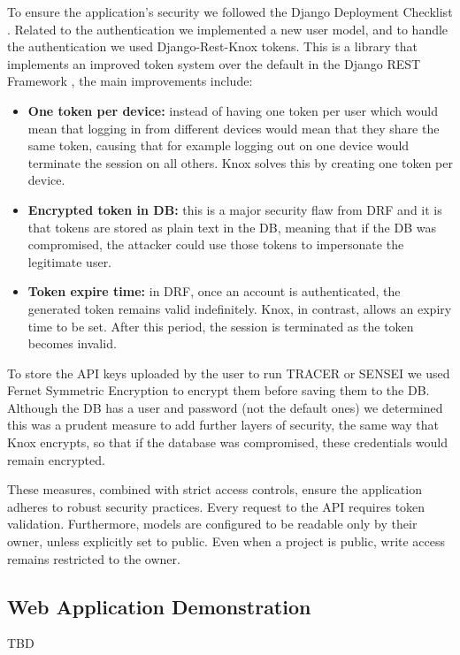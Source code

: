 To ensure the application's security we followed the Django Deployment Checklist \autocite{DeploymentChecklistDjango}.
Related to the authentication we implemented a new user model,
and to handle the authentication we used Django-Rest-Knox \autocite{DjangoRestKnox} tokens.
This is a library that implements an improved token system over the default in the Django REST Framework \autocite{DjangoRESTFramework},
the main improvements include:
\begin{itemize}
  \item \textbf{One token per device:}
    instead of having one token per user
    which would mean that logging in from different devices
    would mean that they share the same token,
    causing that for example
    logging out on one device would terminate the session on all others.
    Knox solves this by creating one token per device.

  \item \textbf{Encrypted token in \ac{DB}:}
    this is a major security flaw from \ac{DRF}
    and it is that tokens are stored as plain text in the \ac{DB},
    meaning that if the \ac{DB} was compromised,
    the attacker could use those tokens to impersonate the legitimate user.

  \item \textbf{Token expire time:}
    in \ac{DRF}, once an account is authenticated, the generated token remains valid indefinitely.
    Knox, in contrast, allows an expiry time to be set.
    After this period, the session is terminated as the token becomes invalid.
\end{itemize}

To store the \ac{API} keys uploaded by the user to run \ac{TRACER} or SENSEI
we used Fernet Symmetric Encryption \autocite{FernetSymmetricEncryption}
to encrypt them before saving them to the \ac{DB}.
Although the \ac{DB} has a user and password (not the default ones)
we determined this was a prudent measure to add further layers of security,
the same way that Knox encrypts, so that
if the database was compromised, these credentials would remain encrypted.

These measures, combined with strict access controls,
ensure the application adheres to robust security practices.
Every request to the \ac{API} requires token validation.
Furthermore, models are configured to be readable only by their owner,
unless explicitly set to public.
Even when a project is public, write access remains restricted to the owner.


\subsection{Web Application Demonstration}

TBD
